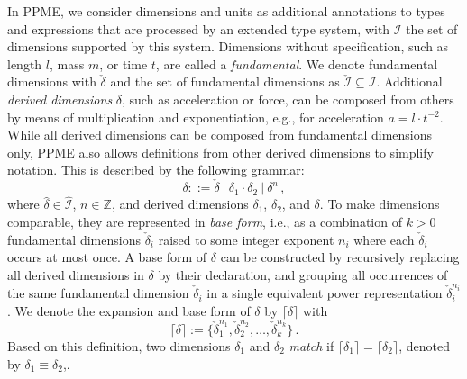 In PPME, we consider dimensions and units as additional annotations to types and expressions
that are processed by an extended type system, with $\mathcal{I}$ the set of
dimensions supported by this system.
%
Dimensions without specification, such as length $l$, mass $m$, or time $t$, are called
a \emph{fundamental}. We denote fundamental dimensions with $\check{\delta}$
and the set of fundamental dimensions as $\check{\mathcal{I}}\subseteq{\mathcal{I}}$. Additional
\emph{derived dimensions} $\delta$, such as acceleration or force, can be composed from others
by means of multiplication and exponentiation, e.g., for acceleration $a = l \cdot t^{-2}$.
While all derived dimensions can be composed from fundamental dimensions only, PPME also allows definitions from other derived dimensions to simplify notation. This is described by the following grammar:
%
  \[ \delta ::= \check{\delta} ~|~ \delta_1 \cdot \delta_2 ~|~ \delta^n \, , \]
%
where $\hat{\delta} \in \hat{\mathcal{I}}$, $n \in \mathbb{Z}$, and derived dimensions
$\delta_1$, $\delta_2$, and $\delta$.
%
%
To make dimensions comparable, they are represented
in \emph{base form}, i.e., as a combination of $k>{0}$ fundamental dimensions $\check{\delta}_i$ raised to some integer
exponent $n_i$ where each $\check{\delta}_i$ occurs at most once.
%
A base form of $\delta$ can be constructed by recursively replacing all derived dimensions
in $\delta$ by their declaration, and grouping all occurrences of the same fundamental dimension
$\check{\delta}_i$ in a single equivalent power representation $\check{\delta}_i^{n_i}$.
We denote the expansion and base form of $\delta$ by $\lceil \delta \rceil$ with
%
  \[ \lceil \delta \rceil := \{ \check{\delta}_1^{n_1}, \check{\delta}_2^{n_2}, \dots, \check{\delta}_k^{n_k} \} \, . \]
%
Based on this definition, two dimensions $\delta_1$ and $\delta_2$ \emph{match} if $\lceil \delta_1 \rceil
= \lceil \delta_2 \rceil$, denoted by $\delta_1 \equiv \delta_2$,.

